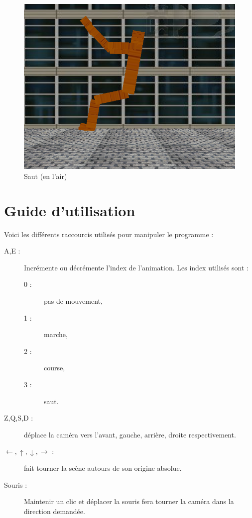 \documentclass[10pt,a4paper,titlepage]{article}
\begin{document}
\begin{figure}[H]
\centering
\includegraphics[width=1\textwidth]{saut2.png}
\caption{Saut (en l'air)}
\end{figure}

\section{Guide d'utilisation}
Voici les différents raccourcis utilisés pour manipuler le programme :
\begin{description}
	\item[A,E :] Incrémente ou décrémente l'index de l'animation. Les index utilisés sont : 
	\begin{description}
		\item[0 :]pas de mouvement,
		\item[1 :]marche,
		\item[2 :]course,
		\item[3 :]saut.
	\end{description}
	\item[Z,Q,S,D :] déplace la caméra vers l'avant, gauche, arrière, droite respectivement.
	\item[$\leftarrow,\uparrow,\downarrow,\rightarrow$ :]fait tourner la scène autours de son origine absolue.
	\item[Souris :] Maintenir un clic et déplacer la souris fera tourner la caméra dans la direction demandée.
\end{description}
\end{document}
